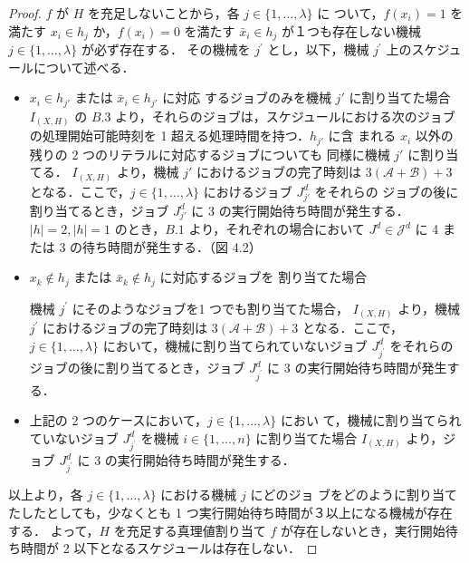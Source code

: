 \documentclass[12pt]{optlab-bachelor}
\begin{document}
\begin{proof}
  $f$ が $H$ を充足しないことから，各 $j \in \{1, \ldots, \lambda \}$ に
  ついて，$f(x_i) = 1$ を満たす $x_i \in h_j$ か，$f(x_i) = 0$ を満たす
  $\bar x_i \in h_j$ が１つも存在しない機械 $j \in \{1,\ldots, \lambda\}$ が必ず存在する．
  その機械を $j^{\prime}$ とし，以下，機械 $j^{\prime}$ 上のスケジュールについて述べる．
  \begin{itemize}
    \item $x_i \in h_{j'}$ または $\bar x_i \in h_{j'}$ に対応
    するジョブのみを機械 $j'$ に割り当てた場合
    $I_{(X,H)}$ の $B.3$ より，それらのジョブは，スケジュールにおける次のジョブの処理開始可能時刻を 1 超える処理時間を持つ．$h_{j'}$ に含
    まれる $x_i$ 以外の残りの 2 つのリテラルに対応するジョブについても
    同様に機械 $j'$ に割り当てる．
    $I_{(X,H)}$ より，機械 $j'$ におけるジョブの完了時刻は
    $3(\mathcal{A} + \mathcal{B}) + 3$ となる．ここで，$j \in
    \{1,\ldots,\lambda\}$ におけるジョブ $J^d_{j'}$ をそれらの
    ジョブの後に割り当てるとき，ジョブ $J^d_{j'}$ に 3 の実行開始待ち時間が発生する．$|h| = 2,|h| = 1$ のとき，$B.1$ より，それぞれの場合において $J^d \in \mathcal{J}^d$ に 4 または 3 の待ち時間が発生する．（図 4.2）
  \end{itemize}

  \begin{itemize}
    \item $x_k \notin h_j$ または $\bar x_k \notin h_j$ に対応するジョブを
    割り当てた場合

    機械 $j^{\prime}$ にそのようなジョブを1 つでも割り当てた場合，
    $I_{(X,H)}$ より，機械 $j^{\prime}$ におけるジョブの完了時刻は
    $3(\mathcal{A} + \mathcal{B}) + 3$ となる．ここで，$j \in
    \{1,\ldots,\lambda\}$ において，機械に割り当てられていないジョブ
    $J^d_{j^{\prime}}$ をそれらのジョブの後に割り当てるとき，ジョブ
    $J^d_{j^{\prime}}$ に 3 の実行開始待ち時間が発生する．
    \item 上記の 2 つのケースにおいて，$j \in \{1,\ldots,\lambda\}$ におい
    て，機械に割り当てられていないジョブ $J^d_{j^{\prime}}$ を機械 $i
    \in \{1,\ldots,n\}$ に割り当てた場合 $I_{(X,H)}$ より，ジョブ
    $J^d_{j^{\prime}}$ に 3 の実行開始待ち時間が発生する．
  \end{itemize}
  以上より，各 $j \in \{1,\ldots,\lambda\}$ における機械 $j$ にどのジョ
  ブをどのように割り当てたしたとしても，少なくとも 1 つ実行開始待ち時間が３以上になる機械が存在する．
  よって，$H$ を充足する真理値割り当て $f$ が存在しないとき，実行開始待
  ち時間が 2 以下となるスケジュールは存在しない．
\end{proof}
\end{document}
